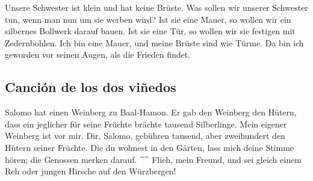  Unsere Schwester ist klein und hat keine Brüste. Was
sollen wir unserer Schwester tun, wenn man nun um sie werben wird?
 Ist sie eine Mauer, so wollen wir ein silbernes Bollwerk
darauf bauen. Ist sie eine Tür, so wollen wir sie festigen mit
Zedernbohlen.  Ich bin eine Mauer, und meine Brüste sind
wie Türme. Da bin ich geworden vor seinen Augen, als die Frieden findet.

\hypertarget{canciuxf3n-de-los-dos-viuxf1edos}{%
\subsection{Canción de los dos
viñedos}\label{canciuxf3n-de-los-dos-viuxf1edos}}

 Salomo hat einen Weinberg zu Baal-Hamon. Er gab den
Weinberg den Hütern, dass ein jeglicher für seine Früchte brächte
tausend Silberlinge.  Mein eigener Weinberg ist vor mir.
Dir, Salomo, gebühren tausend, aber zweihundert den Hütern seiner
Früchte.  Die du wohnest in den Gärten, lass mich deine
Stimme hören; die Genossen merken darauf. \^{}\^{} 
Flieh, mein Freund, und sei gleich einem Reh oder jungen Hirsche auf den
Würzbergen!
